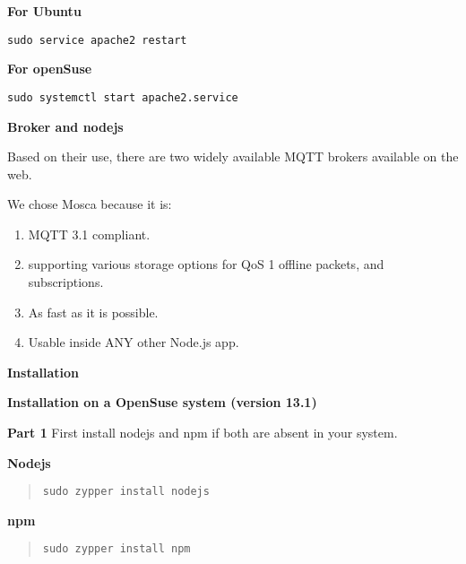 \documentclass[16pt]{article}
\begin{document}
\begin{enumerate}
\begin{enumerate}
  \textbf{For Ubuntu}

  \texttt{sudo service apache2 restart}

  \textbf{For openSuse}

  \texttt{sudo systemctl start apache2.service}
   \vspace{0.5cm}

  \end{enumerate}

  

{\Large{\item\textbf{Broker and nodejs}}} 
 \vspace{0.5cm}

Based on their use, there are two widely available MQTT brokers
available on the web. 

We chose Mosca because it is: 

\begin{enumerate}

\item MQTT 3.1 compliant.
\item supporting various storage options for QoS 1 offline packets, and subscriptions.
\item As fast as it is possible.
\item Usable inside ANY other Node.js app.

\end{enumerate}
 \vspace{0.5cm}

{\Large{\textbf{Installation}}}


\textbf{Installation on a OpenSuse system (version
13.1)}

\textbf{Part 1} First install nodejs and npm if both are absent in your
system.

 \vspace{1cm}
 
\textbf{Nodejs}

\begin{quote}
\texttt{sudo zypper install nodejs}
\end{quote}

\textbf{npm}

\begin{quote}
\texttt{sudo zypper install npm}
\end{quote}


\end{enumerate}
\end{document}
